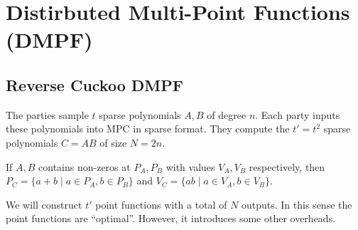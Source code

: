 
\section{Distirbuted Multi-Point Functions (DMPF)}

\subsection{Reverse Cuckoo DMPF}

\iffalse
The parties sample $t$ sparse polynomials $A,B$ of degree $n$. Each party inputs these polynomials into MPC in sparse format. They compute the $t'=t^2$ sparse polynomials $C=AB$ of size $N=2n$.

If $A,B$ contains non-zeros at $P_A,P_B$ with values $V_A,V_B$ respectively, then $P_C=\{ a+b \mid a\in P_A,b\in P_B\}$ and $V_C=\{ ab \mid a\in V_A,b\in V_B\}$.

We will construct $t'$ point functions with a total of $N$ outputs. In this sense the point functions are ``optimal''. However, it introduces some other overheads.

